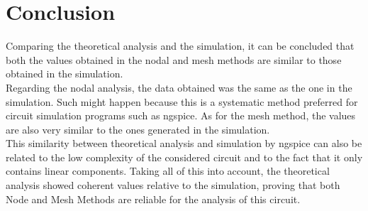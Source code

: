 \newpage
\section{Conclusion}
\label{sec:conclusion}
Comparing the theoretical analysis and the simulation, it can be concluded that both the values obtained in the nodal 
and mesh methods are similar to those obtained in the simulation. \\
\noindent Regarding the nodal analysis, the data obtained was the same as the one in the simulation. 
Such might happen because this is a systematic method preferred for circuit simulation programs such as ngspice.
As for the mesh method, the values are also very similar to the ones generated in the simulation. \\
This similarity between theoretical analysis and simulation by ngspice can also be related to the low complexity of the considered circuit
and to the fact that it only contains linear components.
\noindent Taking all of this into account, the theoretical analysis showed coherent values relative to the simulation, 
proving that both Node and Mesh Methods are reliable for the analysis of this circuit.


